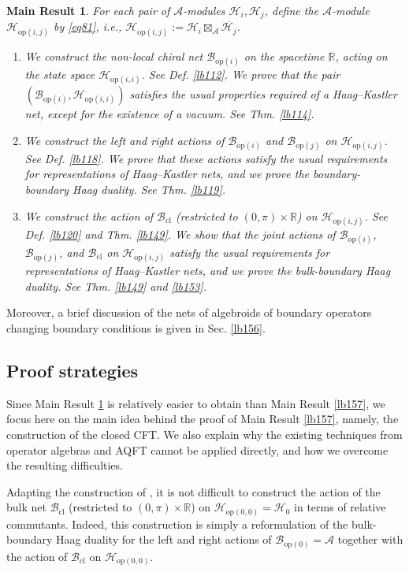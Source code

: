 \documentclass[11pt,b5paper,notitlepage]{article}
\theoremstyle{definition}
\theoremstyle{plain}
\newtheorem{mrs}[df]{Main Result}
\newcommand{\ovl}{\overline}
\newcommand{\Rbb}{\mathbb R}
\newcommand{\MA}{\mathcal A}
\newcommand{\MH}{\mathcal H}
\newcommand{\Bcl}{\mathcal B_{\mathrm{cl}}}
\newcommand{\Bop}[1]{\mathcal B_{\mathrm{op}({#1})}}
\newcommand{\Bopi}{\mathcal B_{\mathrm{op}(i)}}
\newcommand{\Bopj}{\mathcal B_{\mathrm{op}(j)}}
\newcommand{\Hop}[1]{\mathcal H_{\mathrm{op}({#1})}}
\newcommand{\Hopij}{\mathcal H_{\mathrm{op}(i,j)}}
\newcommand{\Hopii}{\mathcal H_{\mathrm{op}(i,i)}}
\numberwithin{equation}{section}
\begin{document}
\begin{mrs}\label{lb158}
For each pair of $\MA$-modules $\MH_i,\MH_j$, define the $\MA$-module $\Hopij$ by \eqref{eq81}, i.e., $\Hopij:=\MH_i\boxtimes_\MA\ovl{\MH_j}$.
\begin{enumerate}[label=(\arabic*)]
\item We construct the non-local chiral net $\Bopi$ on the spacetime $\Rbb$, acting on the state space $\Hop{i,i}$. See Def. \ref{lb112}. We prove that the pair $(\Bopi,\Hopii)$ satisfies the usual properties required of a Haag--Kastler net, except for the existence of a vacuum. See Thm. \ref{lb114}.

\item We construct the left and right actions of $\Bopi$ and $\Bopj$ on $\Hopij$. See Def. \ref{lb118}. We prove that these actions satisfy the usual requirements for representations of Haag--Kastler nets, and we prove the boundary-boundary Haag duality. See Thm. \ref{lb119}.

\item We construct the action of $\Bcl$ (restricted to $(0,\pi)\times\Rbb$) on $\Hopij$. See Def. \ref{lb120} and Thm. \ref{lb149}. We show that the joint actions of $\Bopi$, $\Bopj$, and $\Bcl$ on $\Hopij$ satisfy the usual requirements for representations of Haag--Kastler nets, and we prove the bulk-boundary Haag duality. See Thm. \ref{lb149} and \ref{lb153}.
\end{enumerate}
\end{mrs}

Moreover, a brief discussion of the nets of algebroids of boundary operators changing boundary conditions is given in Sec. \ref{lb156}.


\subsection{Proof strategies}\label{lb159}


Since Main Result \ref{lb158} is relatively easier to obtain than Main Result \ref{lb157}, we focus here on the main idea behind the proof of Main Result \ref{lb157}, namely, the construction of the closed CFT. We also explain why the existing techniques from operator algebras and AQFT cannot be applied directly, and how we overcome the resulting difficulties.


Adapting the construction of \cite{LR04}, it is not difficult to construct the action of the bulk net $\Bcl$ (restricted to $(0,\pi)\times\Rbb$) on $\Hop{0,0}=\MH_0$ in terms of relative commutants. Indeed, this construction is simply a reformulation of the bulk-boundary Haag duality for the left and right actions of $\Bop{0}=\MA$ together with the action of $\Bcl$ on $\Hop{0,0}$. 
\end{document}
